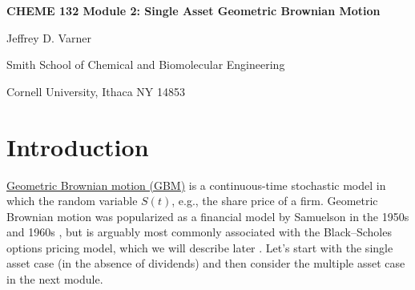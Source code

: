 \documentclass[11pt]{article}
\theoremstyle{definition}
\begin{document}
{\par\centering\textbf{\Large CHEME 132 Module 2: Single Asset Geometric Brownian Motion}}
\vspace{0.2in}
{\par \centering \large{Jeffrey D. Varner}}
\vspace{0.05in}
{\par \centering \large{Smith School of Chemical and Biomolecular Engineering}}
{\par \centering \large{Cornell University, Ithaca NY 14853}}

\date{}
\thispagestyle{empty}

\setcounter{page}{1}

\section*{Introduction}
\href{https://en.wikipedia.org/wiki/Geometric_Brownian_motion}{Geometric Brownian motion (GBM)} is a continuous-time stochastic model in which the random variable $S(t)$, 
e.g., the share price of a firm. 
Geometric Brownian motion was popularized as a financial model by Samuelson in the 1950s and 1960s \cite{Merton2006}, 
but is arguably most commonly associated with the Black–Scholes options pricing model, which we will describe later 
\cite{BlackScholes1973}. Let's start with the single asset case (in the absence of dividends) 
and then consider the multiple asset case in the next module.
\end{document}
